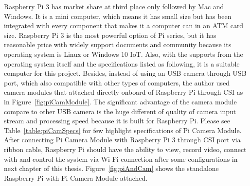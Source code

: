 Raspberry Pi 3 has market share at third place only followed by Mac and Windows. It is a mini computer, which means it has small size but has been integrated with every component that makes it a computer can in an ATM card size. Raspberry Pi 3 is the most powerful option of Pi series, but it has reasonable price with widely support documents and community because its operating system is Linux or Windows 10 IoT.  Also, with the supports from the operating system itself and the specifications listed as following, it is a suitable computer for this project. Besides, instead of using an USB camera through USB port, which also compatible with other types of computers, the author used camera modules that attached directly onboard of Raspberry Pi through CSI as in Figure~\ref{fig:piCamModule}. The significant advantage of the camera module compare to other USB camera is the huge different of quality of camera input stream and processing speed because it is built for Raspberry Pi. Please see Table~\ref{table:piCamSpecs} for few highlight specifications of Pi Camera Module. After connecting Pi Camera Module with Raspberry Pi 3 through CSI port via ribbon cable, Raspberry Pi should have the ability to view, record video, connect with and control the system via Wi-Fi connection after some configurations in next chapter of this thesis. Figure~\ref{fig:piAndCam} shows the standalone Raspberry Pi with Pi Camera Module attached.

